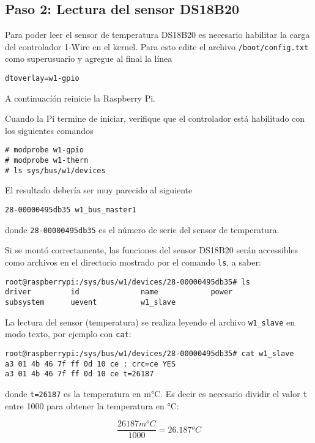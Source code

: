 %
%



\subsection{Paso 2: Lectura del sensor DS18B20}%
\label{sec:step2}
Para poder leer el sensor de temperatura DS18B20 es necesario habilitar la carga del controlador 1-Wire en el kernel.
Para esto edite el archivo \texttt{/boot/config.txt} como superusuario y agregue al final la línea

\begin{Verbatim}
dtoverlay=w1-gpio
\end{Verbatim}

\noindent
A continuacíón reinicie la Raspberry Pi.

\medskip

\noindent
Cuando la Pi termine de iniciar, verifique que el controlador está habilitado con los siguientes comandos

\begin{Verbatim}
# modprobe w1-gpio
# modprobe w1-therm
# ls sys/bus/w1/devices
\end{Verbatim}

\noindent
El resultado debería ser muy parecido al siguiente

\begin{Verbatim}
28-00000495db35 w1_bus_master1
\end{Verbatim}

\noindent
donde \texttt{28-00000495db35} es el número de serie del sensor de temperatura.

\medskip

Si se montó correctamente, las funciones del sensor DS18B20 serán accessibles como archivos en el directorio mostrado por el comando \texttt{ls}, a saber:
\begin{Verbatim}
root@raspberrypi:/sys/bus/w1/devices/28-00000495db35# ls
driver         id              name            power
subsystem      uevent          w1_slave
\end{Verbatim}

La lectura del sensor (temperatura) se realiza leyendo el archivo \texttt{w1\_slave} en modo texto, por ejemplo con \texttt{cat}:
\begin{Verbatim}
root@raspberrypi:/sys/bus/w1/devices/28-00000495db35# cat w1_slave
a3 01 4b 46 7f ff 0d 10 ce : crc=ce YES
a3 01 4b 46 7f ff 0d 10 ce t=26187
\end{Verbatim}

\noindent
donde \texttt{t=26187} es la temperatura en m°C.
Es decir es necesario dividir el valor \texttt{t} entre 1000 para obtener la temperatura en °C: %

\begin{equation*}
\frac{26187m{}^{o}C}{1000} = 26.187{}^{o}C
\end{equation*}
